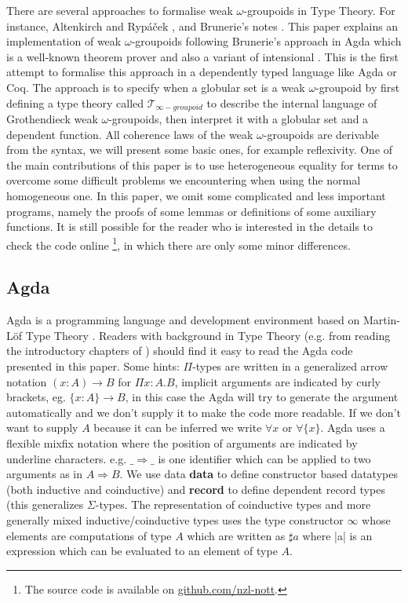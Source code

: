 \documentclass{acm_proc_article-sp}
\newcommand{\wog}{weak $\omega$-groupoids}
\newcommand{\wogs}{weak $\omega$-groupoid} %
\newcommand{\tig}{$\mathcal{T}_{\infty-groupoid}$}
\begin{document}
There are several approaches to formalise {\wog} in Type Theory. For instance, Altenkirch and Ryp\'a\v{c}ek \cite{txa:csl}, and Brunerie's notes \cite{gb:wog}.
This paper explains an implementation of {\wog} following Brunerie's approach in Agda which is a well-known theorem prover and also a variant of intensional {\mltt}. This is the first attempt to formalise this approach in a dependently typed language like Agda or Coq. The approach is to specify when a globular set is a {\wogs} by first defining a type theory called {\tig} to describe the internal language
of Grothendieck {\wog}, then interpret it with a globular set and a dependent function. All coherence laws of the {\wog} are derivable from the syntax, we will present some basic ones, for example reflexivity. One of the main contributions of this paper is to use heterogeneous equality for terms to overcome some difficult problems we encountering when using the normal homogeneous one. In this paper, we omit some complicated and less important programs, namely the proofs of some lemmas or definitions of some auxiliary functions. It is still possible for the reader who is interested in the details to check the code online \footnote{The source code is available on \url{github.com/nzl-nott}.}, in which there are only some minor differences.

\subsection*{Agda}

Agda is a programming language and development environment based on
Martin-Löf Type Theory \cite{agda-wiki}. Readers with background in
Type Theory (e.g. from reading the introductory chapters of
\cite{hott}) should find it easy to read the Agda code presented
in this paper. Some hints: $\Pi$-types are written in a generalized
arrow notation $(x : A) → B$ for $\Pi x:A.B$, implicit arguments are
indicated by curly brackets, eg. $\{x : A\} → B$, in this case the Agda
will try to generate the argument automatically and we don't supply it
to make the code more readable. If we don't want to supply $A$ because
it can be inferred we write $\forall x$ or $\forall\{x\}$.
Agda uses a flexible mixfix notation
where the position of arguments are indicated by underline characters.
e.g. $\_⇒\_$ is one identifier which can be applied to two arguments as
in $A ⇒ B$.  
We use data \textbf{data} to define constructor based datatypes (both
inductive and coinductive) and \textbf{record} to define dependent record
types (this generalizes $\Sigma$-types. The representation of
coinductive types and more generally mixed inductive/coinductive types
\cite{txa:mpc2010g}
uses the type constructor $\infty$ whose elements are computations of type
$A$ which are written as $\sharp a$ where |a| is an expression which can be
evaluated to an element of type $A$.
\end{document}
